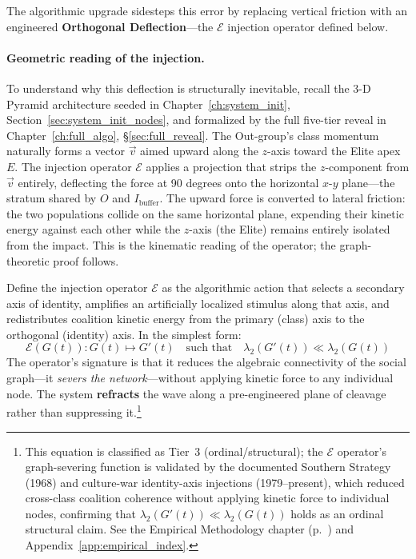 The algorithmic upgrade sidesteps this error by replacing vertical friction with an engineered \textbf{Orthogonal Deflection}---the $\mathcal{E}$ injection operator defined below.

\paragraph{Geometric reading of the injection.}
To understand why this deflection is structurally inevitable, recall the
3-D Pyramid architecture seeded in Chapter~\ref{ch:system_init},
Section~\ref{sec:system_init_nodes}, and formalized by the full five-tier
reveal in Chapter~\ref{ch:full_algo}, \S\ref{sec:full_reveal}.
The Out-group's class momentum naturally forms a vector $\vec{v}$ aimed upward
along the $z$-axis toward the Elite apex $E$. The injection operator $\mathcal{E}$
applies a projection that strips the $z$-component from $\vec{v}$ entirely,
deflecting the force at 90 degrees onto the horizontal $x$-$y$ plane---the
stratum shared by $O$ and $I_{\text{buffer}}$. The upward force is converted to
lateral friction: the two populations collide on the same horizontal plane,
expending their kinetic energy against each other while the $z$-axis (the Elite)
remains entirely isolated from the impact. This is the kinematic reading of the
operator; the graph-theoretic proof follows.

Define the injection operator $\mathcal{E}$ as the algorithmic action that selects
a secondary axis of identity, amplifies an artificially localized stimulus along
that axis, and redistributes coalition kinetic energy from the primary (class)
axis to the orthogonal (identity) axis. In the simplest form:
\begin{equation}\label{eq:14.3-orthogonal-vector-injection}
\mathcal{E}(G(t)) : G(t) \longmapsto G'(t) \quad \text{such that} \quad \lambda_2(G'(t)) \ll \lambda_2(G(t))
\end{equation}
The operator's signature is that it reduces the algebraic connectivity of the social graph---it \textit{severs the network}---without applying kinetic force to any individual node. The system \textbf{refracts} the wave along a pre-engineered plane of cleavage rather than suppressing it.\footnote{This equation is classified as Tier~3 (ordinal/structural); the $\mathcal{E}$ operator's graph-severing function is validated by the documented Southern Strategy (1968) and culture-war identity-axis injections (1979--present), which reduced cross-class coalition coherence without applying kinetic force to individual nodes, confirming that $\lambda_2(G'(t)) \ll \lambda_2(G(t))$ holds as an ordinal structural claim. See the Empirical Methodology chapter (p.~\pageref{ch:empirical_methodology}) and Appendix~\ref{app:empirical_index}.}

